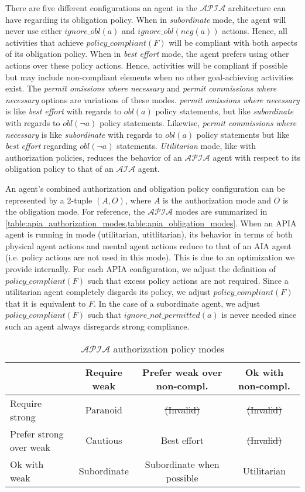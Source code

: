 There are five different configurations an agent in the $\mathcal{APIA}$ architecture can have regarding its obligation policy.
When in \textit{subordinate} mode, the agent will never use either $ignore\_obl(a)$ and $ignore\_obl(neg(a))$ actions.
Hence, all activities that achieve $policy\_compliant(F)$ will be compliant with both aspects of its obligation policy.
When in \textit{best effort} mode, the agent prefers using other actions over these policy actions.
Hence, activities will be compliant if possible but may include non-compliant elements when no other goal-achieving activities exist.
The \textit{permit omissions where necessary} and \textit{permit commissions where necessary} options are variations of these modes.
\textit{permit omissions where necessary} is like \textit{best effort} with regards to $obl(a)$ policy statements, but like \textit{subordinate} with regards to $obl(\neg a)$ policy statements.
Likewise, \textit{permit commissions where necessary} is like \textit{subordinate} with regards to $obl(a)$ policy statements but like \textit{best effort} regarding $obl(\neg a)$ statements.
\textit{Utilitarian} mode, like with authorization policies, reduces the behavior of an $\mathcal{APIA}$ agent with respect to its obligation policy to that of an $\mathcal{AIA}$ agent.

An agent's combined authorization and obligation policy configuration can be represented by a 2-tuple $(A, O)$, where $A$ is the authorization mode and $O$ is the obligation mode.
For reference, the $\mathcal{APIA}$ modes are summarized in \cref{table:apia_authorization_modes,table:apia_obligation_modes}.
When an APIA agent is running in mode (utilitarian, utitlitarian), its behavior in terms of both physical agent actions and mental agent actions reduce to that of an AIA agent (i.e. policy actions are not used in this mode).
This is due to an optimization we provide internally.
For each APIA configuration, we adjust the definition of $policy\_compliant(F)$ such that excess policy actions are not required.
Since a utilitarian agent completely disgards its policy, we adjust $policy\_compliant(F)$ that it is equivalent to $F$.
In the case of a subordinate agent, we adjust $policy\_compliant(F)$ such that $ignore\_not\_permitted(a)$ is never needed since such an agent always disregards strong compliance.

\begin{table}[h]
    \centering
    \begin{tabular}{ | l | c | c | c | }
        \hline
        & Require weak & Prefer weak over non-compl. & Ok with non-compl. \\
        \hline
        Require strong & Paranoid & \sout{(Invalid)} & \sout{(Invalid)} \\
        \hline
        Prefer strong over weak & Cautious & Best effort & \sout{(Invalid)} \\
        \hline
        Ok with weak & Subordinate & Subordinate when possible & Utilitarian \\
        \hline
    \end{tabular}
    \caption{$\mathcal{APIA}$ authorization policy modes}
    \label{table:apia_authorization_modes}
\end{table}


